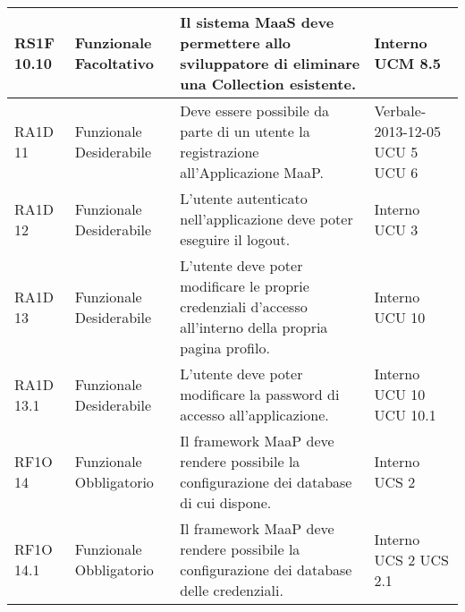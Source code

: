 \begin{center}
\begin{longtable}{ | l | p{2cm} | p{5cm} | p{1.7cm} |}
				RS1F 10.10 & Funzionale \newline  Facoltativo  & Il sistema MaaS deve permettere allo sviluppatore di eliminare una Collection esistente. &  Interno \newline  UCM 8.5 \newline  \\ \hline      
				RA1D 11 & Funzionale \newline  Desiderabile  & Deve essere possibile da parte di un utente la registrazione all’Applicazione MaaP. &  Verbale-2013-12-05 \newline  UCU 5 \newline  UCU 6 \newline  \\ \hline      
				RA1D 12 & Funzionale \newline  Desiderabile  & L’utente autenticato nell’applicazione deve poter eseguire il logout. &  Interno \newline  UCU 3 \newline  \\ \hline      
				RA1D 13 & Funzionale \newline  Desiderabile  & L'utente deve poter modificare le proprie credenziali d'accesso all'interno della propria pagina profilo. &  Interno \newline  UCU 10 \newline  \\ \hline      
				RA1D 13.1 & Funzionale \newline  Desiderabile  & L’utente deve poter modificare la password di accesso all’applicazione. &  Interno \newline  UCU 10 \newline  UCU 10.1 \newline  \\ \hline      
				RF1O 14 & Funzionale \newline  Obbligatorio  & Il framework MaaP deve rendere possibile la configurazione dei database di cui dispone. &  Interno \newline  UCS 2 \newline  \\ \hline      
				RF1O 14.1 & Funzionale \newline  Obbligatorio  & Il framework MaaP deve rendere possibile la configurazione dei database delle credenziali. &  Interno \newline  UCS 2 \newline  UCS 2.1 \newline  \\ \hline      

\end{longtable}
\end{center}
